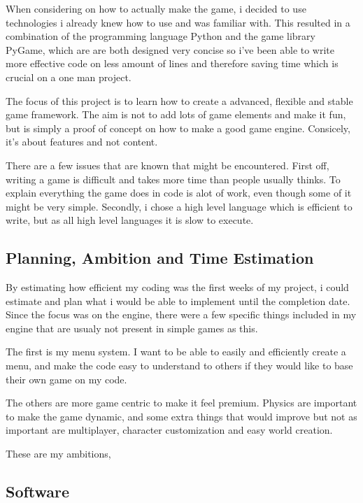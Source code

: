 \documentclass[a4paper,12pt]{article}
\begin{document}
When considering on how to actually make the game, i decided to use technologies i already knew how to use and was familiar with. 
This resulted in a combination of the programming language Python and the game library PyGame, which are are both designed very concise so i've been able to write more effective code on less amount of lines and therefore saving time which is crucial on a one man project.

The focus of this project is to learn how to create a advanced, flexible and stable game framework.
The aim is not to add lots of game elements and make it fun, but is simply a proof of concept on how to make a good game engine.
Consicely, it's about features and not content.

There are a few issues that are known that might be encountered. First off, writing a game is difficult and takes more time than people usually thinks. To explain everything the game does in code is alot of work, even though some of it might be very simple.
Secondly, i chose a high level language which is efficient to write, but as all high level languages it is slow to execute.  



\subsection{Planning, Ambition and Time Estimation}

By estimating how efficient my coding was the first weeks of my project, i could estimate and plan what i would be able to implement until the completion date.
Since the focus was on the engine, there were a few specific things included in my engine that are usualy not present in simple games as this.

The first is my menu system.
I want to be able to easily and efficiently create a menu, and make the code easy to understand to others if they would like to base their own game on my code.

The others are more game centric to make it feel premium.
Physics are important to make the game dynamic, and some extra things that would improve but not as important are multiplayer, character customization and easy world creation.

These are my ambitions,


\subsection{Software}
\end{document}
